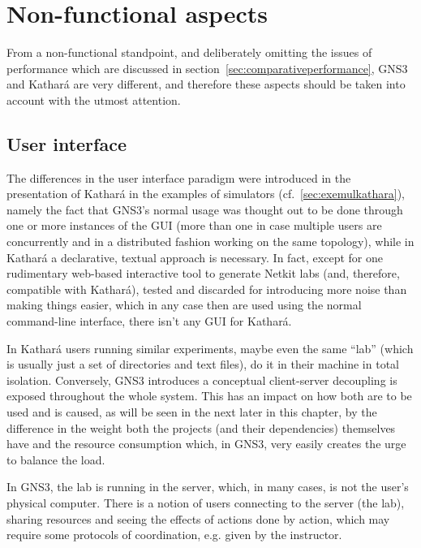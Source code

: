 \section{Non-functional aspects}
\label{sec:comparativenonfunctional}

From a non-functional standpoint, and deliberately omitting the issues of performance which are discussed in section~\ref{sec:comparativeperformance}, GNS3 and Kathará are very different, and therefore these aspects should be taken into account with the utmost attention.

\subsection{User interface}
\label{subsec:comparativeui}

The differences in the user interface paradigm were introduced in the presentation of Kathará in the examples of simulators (cf.~\ref{sec:exemulkathara}), namely the fact that GNS3's normal usage was thought out to be done through one or more instances of the GUI (more than one in case multiple users are concurrently and in a distributed fashion working on the same topology), while in Kathará a declarative, textual approach is necessary.
In fact, except for one rudimentary web-based interactive tool to generate Netkit labs (and, therefore, compatible with Kathará), tested and discarded for introducing more noise than making things easier, which in any case then are used using the normal command-line interface, there isn't any GUI for Kathará.

In Kathará users running similar experiments, maybe even the same ``lab'' (which is usually just a set of directories and text files), do it in their machine in total isolation.
Conversely, GNS3 introduces a conceptual client-server decoupling is exposed throughout the whole system.
This has an impact on how both are to be used and is caused, as will be seen in the next later in this chapter, by the difference in the weight both the projects (and their dependencies) themselves have and the resource consumption which, in GNS3, very easily creates the urge to balance the load.



In GNS3, the lab is running in the server, which, in many cases, is not the user's physical computer.
There is a notion of users connecting to the server (the lab), sharing resources and seeing the effects of actions done by action, which may require some protocols of coordination, e.g. given by the instructor.

